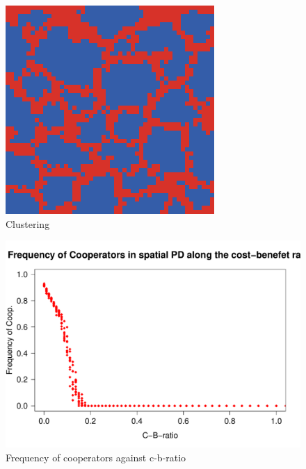 \documentclass[DIV=calc, paper=a4, fontsize=11pt, twocolumn]{scrartcl}	 %
\begin{document}
\begin{figure}[here]
\centering
\begin{minipage}{.35\textwidth}
  \centering
  \includegraphics[width=1\linewidth]{PDspatial8cost01}
 \caption{Clustering}
\label{fig:PDspatialcluster}
\end{minipage}%
\end{figure}

\begin{figure}
\begin{minipage}{.48\textwidth}
  \centering
  \includegraphics[width=1\linewidth]{PDspatial}
 \caption{Frequency of cooperators against c-b-ratio}
  \label{fig:PDspatialfreq}
\end{minipage}
\end{figure}
\end{document}
